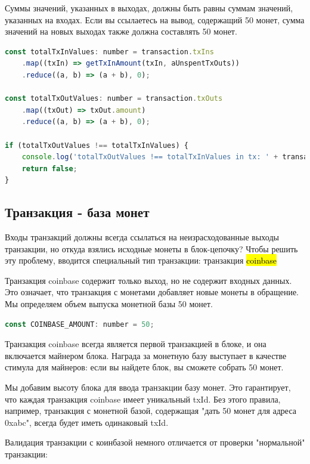 \documentclass{article}
\begin{document}
Суммы значений, указанных в выходах, должны быть равны суммам значений, указанных на входах. Если вы ссылаетесь на вывод, содержащий 50 монет, сумма значений на новых выходах также должна составлять 50 монет.

\begin{lstlisting}[language=JavaScript, caption={Проверка выходов транзакции.}]
const totalTxInValues: number = transaction.txIns
	.map((txIn) => getTxInAmount(txIn, aUnspentTxOuts))
	.reduce((a, b) => (a + b), 0);

const totalTxOutValues: number = transaction.txOuts
	.map((txOut) => txOut.amount)
	.reduce((a, b) => (a + b), 0);

if (totalTxOutValues !== totalTxInValues) {
	console.log('totalTxOutValues !== totalTxInValues in tx: ' + transaction.id);
	return false;
}
\end{lstlisting}


\subsection{Транзакция - база монет}

Входы транзакций должны всегда ссылаться на неизрасходованные выходы транзакции, но откуда взялись исходные монеты в блок-цепочку? Чтобы решить эту проблему, вводится специальный тип транзакции: транзакция \hl{coinbase}

Транзакция coinbase содержит только выход, но не содержит входных данных. Это означает, что транзакция с монетами добавляет новые монеты в обращение. Мы определяем объем выпуска монетной базы 50 монет.


\begin{lstlisting}[language=JavaScript]
const COINBASE_AMOUNT: number = 50;
\end{lstlisting}

Транзакция coinbase всегда является первой транзакцией в блоке, и она включается майнером блока. Награда за монетную базу выступает в качестве стимула для майнеров: если вы найдете блок, вы сможете собрать 50 монет.

Мы добавим высоту блока для ввода транзакции базу монет. Это гарантирует, что каждая транзакция coinbase имеет уникальный txId. Без этого правила, например, транзакция с монетной базой, содержащая "дать 50 монет для адреса 0xabc", всегда будет иметь одинаковый txId.

Валидация транзакции с коинбазой немного отличается от проверки "нормальной" транзакции:
\end{document}
